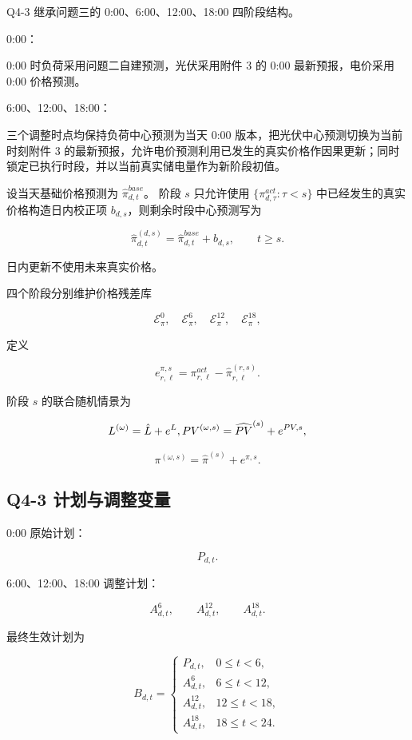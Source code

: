 Q4-3 继承问题三的 0:00、6:00、12:00、18:00 四阶段结构。

0:00：

0:00 时负荷采用问题二自建预测，光伏采用附件 3 的 0:00 最新预报，电价采用 0:00 价格预测。

6:00、12:00、18:00：

三个调整时点均保持负荷中心预测为当天 0:00 版本，把光伏中心预测切换为当前时刻附件 3 的最新预报，允许电价预测利用已发生的真实价格作因果更新；同时锁定已执行时段，并以当前真实储电量作为新阶段初值。

设当天基础价格预测为 \(\hat\pi_{d,t}^{base}\)。 阶段 \(s\) 只允许使用 \(\{\pi^{act}_{d,\tau}:\tau<s\}\) 中已经发生的真实价格构造日内校正项 \(b_{d,s}\)，则剩余时段中心预测写为

\begin{equation}
\hat\pi_{d,t}^{(d,s)}
=
\hat\pi_{d,t}^{base}
+
b_{d,s},
\qquad
t\ge s.
\end{equation}

日内更新不使用未来真实价格。

四个阶段分别维护价格残差库

\[
\mathcal E_\pi^0,\quad
\mathcal E_\pi^6,\quad
\mathcal E_\pi^{12},\quad
\mathcal E_\pi^{18},
\]

定义

\begin{equation}
e^{\pi,s}_{r,\ell}
=
\pi^{act}_{r,\ell}
-
\hat\pi^{(r,s)}_{r,\ell}.
\end{equation}

阶段 \(s\) 的联合随机情景为

\[
L^{(\omega)}
=
\hat L+e^L,\\
PV^{(\omega,s)}
=
\widehat{PV}^{(s)}
+
e^{PV,s},
\]

\begin{equation}
\pi^{(\omega,s)}
=
\hat\pi^{(s)}
+
e^{\pi,s}.
\end{equation}

\subsection{Q4-3 计划与调整变量}

0:00 原始计划：

\[
P_{d,t}.
\]

6:00、12:00、18:00 调整计划：

\[
A^6_{d,t},
\qquad
A^{12}_{d,t},
\qquad
A^{18}_{d,t}.
\]

最终生效计划为

\begin{equation}
B_{d,t}
=
\begin{cases}
P_{d,t},&0\le t<6,\\
A^6_{d,t},&6\le t<12,\\
A^{12}_{d,t},&12\le t<18,\\
A^{18}_{d,t},&18\le t<24.
\end{cases}
\end{equation}

